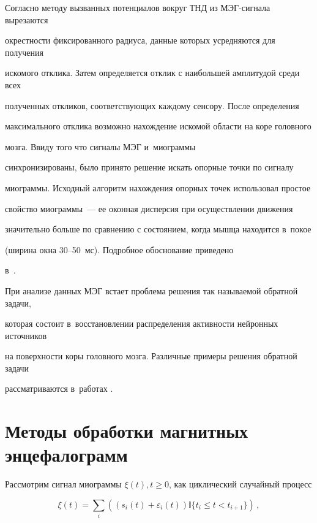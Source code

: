 Согласно методу вызванных потенциалов вокруг ТНД из МЭГ-сиг\-на\-ла вырезаются 

окрестности фиксированного радиуса, данные которых усредняются для получения 

искомого отклика. Затем определяется отклик с наибольшей амплитудой среди всех 

полученных откликов, соответствующих каждому сенсору. После определения 

максимального отклика возможно нахождение искомой об\-ласти на коре головного 

мозга. Ввиду того что сигналы МЭГ и~миограммы 

синхронизированы, было принято решение искать опорные точки по сигналу 

миограммы.  Исходный алгоритм нахождения опорных точек использовал прос\-тое 

свойство миограммы~--- ее оконная дисперсия при осуществлении движения 

значительно больше по сравнению с состоянием, когда мышца находится в~покое 

(ширина окна 30--50~мс). Подробное обоснование приведено 

в~\cite{seven_authors, zah_bening}.



При анализе данных МЭГ встает проблема решения так называемой обратной задачи, 

которая состоит в~восстановлении распределения активности нейронных источников 

на поверхности коры головного мозга. Различные примеры решения обратной задачи 

рассматриваются в~работах  \cite{zah_bening, klaster-1}.



\section{Методы обработки магнитных энцефалограмм}




Рассмотрим сигнал миограммы $\xi(t), t\ge 0$, как циклический случайный процесс

\begin{equation*}

\xi(t) = \sum\limits_{i} \left(\left(s_i(t) + \varepsilon_i(t)\right)

\mathbb{I}\{t_i \le t  < 

t_{i+1}\}\right)\,,

\end{equation*}

